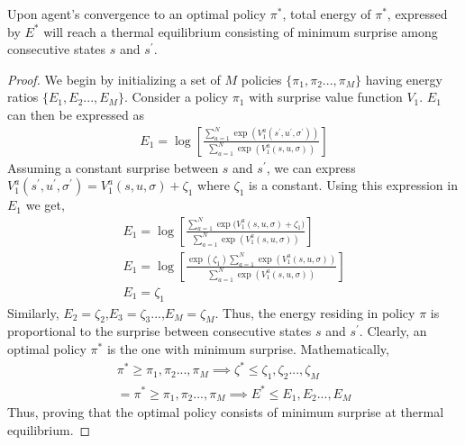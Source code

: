 \documentclass{article}
\begin{document}
\begin{multicols}{2}
\begin{customthm}{2}\label{two}
Upon agent's convergence to an optimal policy $\pi^{*}$, total energy of $\pi^{*}$, expressed by $E^{*}$ will reach a thermal equilibrium consisting of minimum surprise among consecutive states $s$ and $s^{'}$.
\end{customthm}
\begin{proof}
  We begin by initializing a set of $M$ policies $\{\pi_{1},\pi_{2}...,\pi_{M}\}$ having energy ratios $\{E_{1},E_{2}...,E_{M}\}$. Consider a policy $\pi_{1}$ with surprise value function $V_{1}$. $E_{1}$ can then be expressed as
  \begin{gather}
      E_{1} = \log [\frac{\sum_{a=1}^{N}\exp{(V_{1}^{a}(s^{'},u^{'},\sigma^{'}))}}{\sum_{a=1}^{N}\exp{(V_{1}^{a}(s,u,\sigma))}}] \nonumber
  \end{gather}
  Assuming a constant surprise between $s$ and $s^{'}$, we can express $V_{1}^{a}(s^{'},u^{'},\sigma^{'}) = V_{1}^{a}(s,u,\sigma) + \zeta_{1}$ where $\zeta_{1}$ is a constant. Using this expression in $E_{1}$ we get,
  \begin{gather}
      E_{1} = \log [\frac{\sum_{a=1}^{N}\exp{(V_{1}^{a}(s,u,\sigma) + \zeta_{1}})}{\sum_{a=1}^{N}\exp{(V_{1}^{a}(s,u,\sigma))}}] \nonumber \\
      E_{1} = \log [\frac{\exp{(\zeta_{1})}\sum_{a=1}^{N}\exp{(V_{1}^{a}(s,u,\sigma))}}{\sum_{a=1}^{N}\exp{(V_{1}^{a}(s,u,\sigma))}}] \nonumber \\    
      E_{1} = \zeta_{1} \nonumber        
  \end{gather}
  Similarly, $E_{2}=\zeta_{2}$,$E_{3}=\zeta_{3}$...,$E_{M}=\zeta_{M}$. Thus, the energy residing in policy $\pi$ is proportional to the surprise between consecutive states $s$ and $s^{'}$. Clearly, an optimal policy $\pi^{*}$ is the one with minimum surprise. Mathematically,
  \begin{gather}
      \pi^{*} \geq \pi_{1},\pi_{2}...,\pi_{M} \implies \zeta^{*} \leq \zeta_{1},\zeta_{2}...,\zeta_{M} \nonumber \\
      = \pi^{*} \geq \pi_{1},\pi_{2}...,\pi_{M} \implies E^{*} \leq E_{1},E_{2}...,E_{M} \nonumber
  \end{gather}
  Thus, proving that the optimal policy consists of minimum surprise at thermal equilibrium. 
\end{proof}






\end{multicols}
\end{document}
